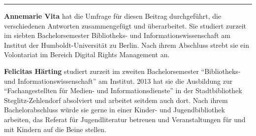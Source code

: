 \begin{center}\rule{0.5\linewidth}{\linethickness}\end{center}

\textbf{Annemarie Vita} hat die Umfrage für diesen Beitrag durchgeführt,
die verschiedenen Antworten zusammengefügt und überarbeitet. Sie
studiert zurzeit im siebten Bachelorsemester Bibliotheks- und
Informationswissenschaft am Institut der Humboldt-Universität zu Berlin.
Nach ihrem Abschluss strebt sie ein Volontariat im Bereich Digital
Rights Management an.

\textbf{Felicitas Härting} studiert zurzeit im zweiten Bachelorsemester
``Bibliotheks- und Informationswissenschaft'' am Institut. 2013 hat sie
die Ausbildung zur ``Fachangestellten für Medien- und
Informationsdienste'' in der Stadtbibliothek Steglitz-Zehlendorf
absolviert und arbeitet seitdem auch dort. Nach ihrem Bachelorabschluss
würde sie gerne in einer Kinder- und Jugendbibliothek arbeiten, das
Referat für Jugendliteratur betreuen und Veranstaltungen für und mit
Kindern auf die Beine stellen.
